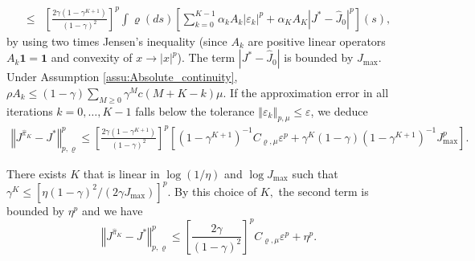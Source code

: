 \documentclass[12pt,technote,onecolumn]{IEEEtran}
\begin{document}
\begin{IEEEproof}
\begin{equation*}
\begin{aligned}
	\leq&  \left[\frac{2\gamma\left(1-\gamma^{K+1}\right)}{\left(1-\gamma\right)^{2}}\right]^{p}
	\int\varrho\left(ds\right)\left[\sum_{k=0}^{K-1}\alpha_{k}A_{k}\left|\varepsilon_{k}\right|^{p}+\alpha_{K}A_{K}|J^{*}-\widehat{J}_{0}|^{p}\right]\left(s\right),
	\end{aligned}
	\end{equation*}
	by using two times Jensen's inequality (since $A_{k}$ are positive
	linear operators $A_{k}\mathbf{1}=\mathbf{1}$ and convexity of $x\rightarrow\left|x\right|^{p}$).
	The term $|J^{*}-\widehat{J}_{0}|$ is bounded by $J_{\max}.$
	Under Assumption \ref{assu:Absolute_continuity}, $\rho A_{k}\leq(1-\gamma)\sum_{M\geq0}\gamma^{M}c\left(M+K-k\right)\mu.$
	If the approximation error in all\textbf{ }iterations $k=0,\dots,K-1$
	falls below the tolerance $\left\Vert \varepsilon_{k}\right\Vert _{p,\mu}\leq\varepsilon$,
	we deduce		
	\begin{equation*}		
	\begin{aligned}
	\left\Vert J^{\widehat{\pi}_{K}}-J^{*}\right\Vert _{p,\varrho}^{p}\leq \left[\frac{2\gamma\left(1-\gamma^{K+1}\right)}{\left(1-\gamma\right)^{2}}\right]^{p}
	[(1-\gamma^{K+1})^{-1}C_{\varrho,\mu}\varepsilon^{p}
	+\gamma^{K}(1-\gamma)(1-\gamma^{K+1})^{-1}J_{\max}^{p}].
	\end{aligned}
	\end{equation*}		
	
	There exists $K$ that is linear in $\log\left(1/\eta\right)$ and
	$\log J_{\max}$ such that $\gamma^{K}\leq[{\eta(1-\gamma)^{2}}/{(2\gamma J_{\max})}]^{p}.$
	By this choice of $K,$ the second term is bounded by $\eta^{p}$
	and we have		
	\[
	\left\Vert J^{\widehat{\pi}_{K}}-J^{*}\right\Vert _{p,\varrho}^{p}\leq\left[\frac{2\gamma}{\left(1-\gamma\right)^{2}}\right]^{p}C_{\varrho,\mu}\varepsilon^{p}+\eta^{p}.
	\]
	
\end{IEEEproof}	
\end{document}
